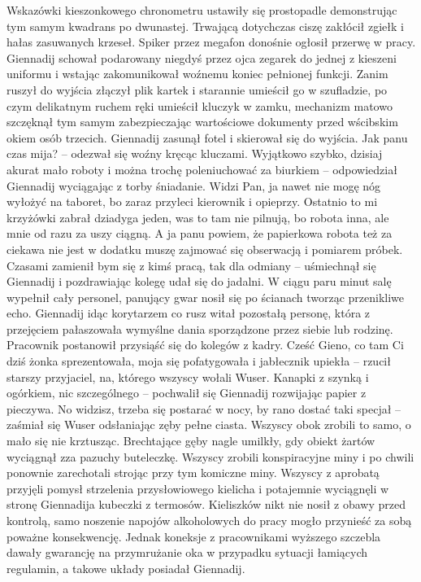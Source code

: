 \documentclass[../MAIN.tex]{subfiles}
\begin{document}
% 
Wskazówki kieszonkowego chronometru ustawiły się prostopadle demonstrując tym samym kwadrans po dwunastej. Trwającą dotychczas ciszę zakłócił zgiełk i hałas zasuwanych krzeseł. Spiker przez megafon donośnie ogłosił przerwę w pracy. Giennadij schował podarowany niegdyś przez ojca zegarek do jednej z kieszeni uniformu i wstając zakomunikował woźnemu koniec pełnionej funkcji. Zanim ruszył do wyjścia złączył plik kartek i starannie umieścił go w szufladzie, po czym delikatnym ruchem ręki umieścił kluczyk w zamku, mechanizm matowo szczęknął tym samym zabezpieczając wartościowe dokumenty przed wścibskim okiem osób trzecich. Giennadij zasunął fotel i skierował się do wyjścia. 
\sx Jak panu czas mija? -- odezwał się woźny kręcąc kluczami. 
\xx Wyjątkowo szybko, dzisiaj akurat mało roboty i można trochę poleniuchować za biurkiem -- odpowiedział Giennadij wyciągając z torby śniadanie. 
\xx Widzi Pan, ja nawet nie mogę nóg wyłożyć na taboret, bo zaraz przyleci kierownik i opieprzy. Ostatnio to mi krzyżówki zabrał dziadyga jeden, was to tam nie pilnują, bo robota inna, ale mnie od razu za uszy ciągną. 
\xx A ja panu powiem, że papierkowa robota też za ciekawa nie jest w dodatku muszę zajmować się obserwacją i pomiarem próbek. Czasami zamienił bym się z kimś pracą, tak dla odmiany -- uśmiechnął się Giennadij i pozdrawiając kolegę udał się do jadalni. 
\qd
W ciągu paru minut salę wypełnił cały personel, panujący gwar nosił się po ścianach tworząc przenikliwe echo. Giennadij idąc korytarzem co rusz witał pozostałą personę, która z przejęciem pałaszowała wymyślne dania sporządzone przez siebie lub rodzinę. Pracownik postanowił przysiąść się do kolegów z kadry. 
\sx
Cześć Gieno, co tam Ci dziś żonka sprezentowała, moja się pofatygowała i jabłecznik upiekła -- rzucił starszy przyjaciel, na, którego wszyscy wołali Wuser. 
\xx Kanapki z szynką i ogórkiem, nic szczególnego -- pochwalił się Giennadij rozwijając papier z pieczywa. 
\xx No widzisz, trzeba się postarać w nocy, by rano dostać taki specjał -- zaśmiał się Wuser odsłaniając zęby pełne ciasta. 
\qd
Wszyscy obok zrobili to samo, o mało się nie krztusząc. Brechtające gęby nagle umilkły, gdy obiekt żartów wyciągnął zza pazuchy buteleczkę. Wszyscy zrobili konspiracyjne miny i po chwili ponownie zarechotali strojąc przy tym komiczne miny. Wszyscy z aprobatą przyjęli pomysł strzelenia przysłowiowego kielicha i potajemnie wyciągnęli w stronę Giennadija kubeczki z termosów. Kieliszków nikt nie nosił z obawy przed kontrolą, samo noszenie napojów alkoholowych do pracy mogło przynieść za sobą poważne konsekwencję. Jednak koneksje z pracownikami wyższego szczebla dawały gwarancję na przymrużanie oka w przypadku sytuacji łamiących regulamin, a takowe układy posiadał Giennadij. 
\end{document}
